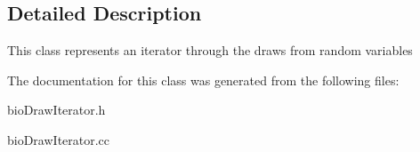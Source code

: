 \subsection{Detailed Description}
This class represents an iterator through the draws from random variables 

The documentation for this class was generated from the following files\+:\begin{DoxyCompactItemize}
\item 
bio\+Draw\+Iterator.\+h\item 
bio\+Draw\+Iterator.\+cc\end{DoxyCompactItemize}
